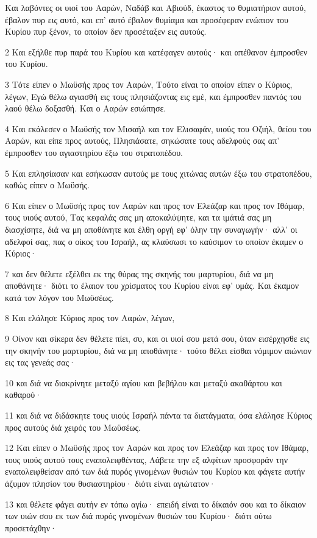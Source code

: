 \par Και λαβόντες οι υιοί του Ααρών, Ναδάβ και Αβιούδ, έκαστος το θυμιατήριον αυτού, έβαλον πυρ εις αυτό, και επ' αυτό έβαλον θυμίαμα και προσέφεραν ενώπιον του Κυρίου πυρ ξένον, το οποίον δεν προσέταξεν εις αυτούς.
\par 2 Και εξήλθε πυρ παρά του Κυρίου και κατέφαγεν αυτούς· και απέθανον έμπροσθεν του Κυρίου.
\par 3 Τότε είπεν ο Μωϋσής προς τον Ααρών, Τούτο είναι το οποίον είπεν ο Κύριος, λέγων, Εγώ θέλω αγιασθή εις τους πλησιάζοντας εις εμέ, και έμπροσθεν παντός του λαού θέλω δοξασθή. Και ο Ααρών εσιώπησε.
\par 4 Και εκάλεσεν ο Μωϋσής τον Μισαήλ και τον Ελισαφάν, υιούς του Οζιήλ, θείου του Ααρών, και είπε προς αυτούς, Πλησιάσατε, σηκώσατε τους αδελφούς σας απ' έμπροσθεν του αγιαστηρίου έξω του στρατοπέδου.
\par 5 Και επλησίασαν και εσήκωσαν αυτούς με τους χιτώνας αυτών έξω του στρατοπέδου, καθώς είπεν ο Μωϋσής.
\par 6 Και είπεν ο Μωϋσής προς τον Ααρών και προς τον Ελεάζαρ και προς τον Ιθάμαρ, τους υιούς αυτού, Τας κεφαλάς σας μη αποκαλύψητε, και τα ιμάτιά σας μη διασχίσητε, διά να μη αποθάνητε και έλθη οργή εφ' όλην την συναγωγήν· αλλ' οι αδελφοί σας, πας ο οίκος του Ισραήλ, ας κλαύσωσι το καύσιμον το οποίον έκαμεν ο Κύριος·
\par 7 και δεν θέλετε εξέλθει εκ της θύρας της σκηνής του μαρτυρίου, διά να μη αποθάνητε· διότι το έλαιον του χρίσματος του Κυρίου είναι εφ' υμάς. Και έκαμον κατά τον λόγον του Μωϋσέως.
\par 8 Και ελάλησε Κύριος προς τον Ααρών, λέγων,
\par 9 Οίνον και σίκερα δεν θέλετε πίει, συ, και οι υιοί σου μετά σου, όταν εισέρχησθε εις την σκηνήν του μαρτυρίου, διά να μη αποθάνητε· τούτο θέλει είσθαι νόμιμον αιώνιον εις τας γενεάς σας·
\par 10 και διά να διακρίνητε μεταξύ αγίου και βεβήλου και μεταξύ ακαθάρτου και καθαρού·
\par 11 και διά να διδάσκητε τους υιούς Ισραήλ πάντα τα διατάγματα, όσα ελάλησε Κύριος προς αυτούς διά χειρός του Μωϋσέως.
\par 12 Και είπεν ο Μωϋσής προς τον Ααρών και προς τον Ελεάζαρ και προς τον Ιθάμαρ, τους υιούς αυτού τους εναπολειφθέντας, Λάβετε την εξ αλφίτων προσφοράν την εναπολειφθείσαν από των διά πυρός γινομένων θυσιών του Κυρίου και φάγετε αυτήν άζυμον πλησίον του θυσιαστηρίου· διότι είναι αγιώτατον·
\par 13 και θέλετε φάγει αυτήν εν τόπω αγίω· επειδή είναι το δίκαιόν σου και το δίκαιον των υιών σου εκ των διά πυρός γινομένων θυσιών του Κυρίου· διότι ούτω προσετάχθην·
